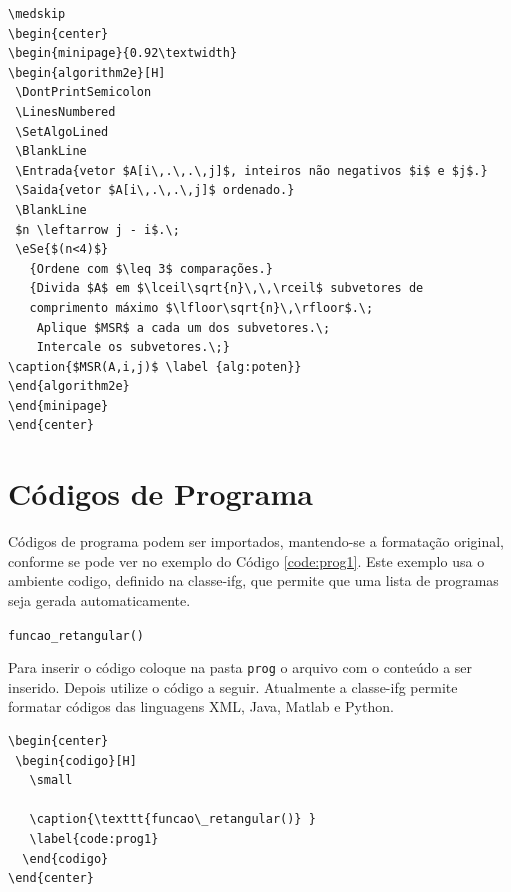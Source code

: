 \begin{verbatim}
\medskip
\begin{center}
\begin{minipage}{0.92\textwidth}
\begin{algorithm2e}[H]
 \DontPrintSemicolon
 \LinesNumbered
 \SetAlgoLined
 \BlankLine
 \Entrada{vetor $A[i\,.\,.\,j]$, inteiros não negativos $i$ e $j$.}
 \Saida{vetor $A[i\,.\,.\,j]$ ordenado.}
 \BlankLine
 $n \leftarrow j - i$.\;
 \eSe{$(n<4)$}
   {Ordene com $\leq 3$ comparações.}
   {Divida $A$ em $\lceil\sqrt{n}\,\,\rceil$ subvetores de 
   comprimento máximo $\lfloor\sqrt{n}\,\rfloor$.\;
    Aplique $MSR$ a cada um dos subvetores.\;
    Intercale os subvetores.\;}
\caption{$MSR(A,i,j)$ \label {alg:poten}}
\end{algorithm2e}
\end{minipage}
\end{center}
\end{verbatim}

\section{Códigos de Programa}
\label{sec:progs} 

Códigos de programa podem ser importados, mantendo-se a formatação original, conforme se pode ver no exemplo do Código \ref{code:prog1}. Este exemplo usa o ambiente \textsf{codigo}, definido na \textsf{classe-ifg}, que permite que uma lista de programas seja gerada automaticamente.

\begin{center}
 \begin{codigo}[H]
   \small
   
   \caption{\texttt{funcao\_retangular()} }
   \label{code:prog1}
  \end{codigo}
\end{center}

Para inserir o código coloque na pasta \verb|prog| o arquivo com o conteúdo a ser inserido. Depois utilize o código a seguir. Atualmente a \textsf{classe-ifg} permite formatar códigos das linguagens XML, Java, Matlab e Python.

\begin{verbatim}
\begin{center}
 \begin{codigo}[H]
   \small
   
   \caption{\texttt{funcao\_retangular()} }
   \label{code:prog1}
  \end{codigo}
\end{center}
\end{verbatim}

